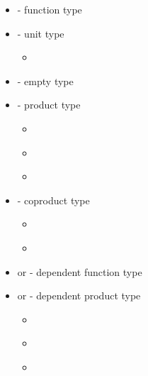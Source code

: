 \begin{itemize}
  \item{  - function type}
  \item{ - unit type}
  \begin{itemize}
    \item{ \AgdaSymbol{:} }
  \end{itemize}
  \item{ - empty type}
  \item{   - product type}
  \begin{itemize}
    \item{\AgdaInductiveConstructor{\_,\_} \AgdaSymbol{:}       }
    \item{ \AgdaSymbol{:}     }
    \item{ \AgdaSymbol{:}     }
  \end{itemize}
  \item{   - coproduct type}
  \begin{itemize}
    \item{ \AgdaSymbol{:}     }
    \item{ \AgdaSymbol{:}     }
  \end{itemize} 
  \item{  or \AgdaSymbol{(} \AgdaSymbol{:} \AgdaSymbol{)}   - dependent function type}
  \item{  or \AgdaFunction{Σ[}    \AgdaFunction{]}  - dependent product type}
  \begin{itemize}
    \item{\AgdaInductiveConstructor{\_,\_} \AgdaSymbol{:} \AgdaSymbol{(} \AgdaSymbol{:} \AgdaSymbol{)}     }
    \item{ \AgdaSymbol{:}    }
    \item{ \AgdaSymbol{:} \AgdaSymbol{(} \AgdaSymbol{:}  \AgdaSymbol{)}   \AgdaSymbol{(} \AgdaSymbol{)}}
  \end{itemize}
\end{itemize}

